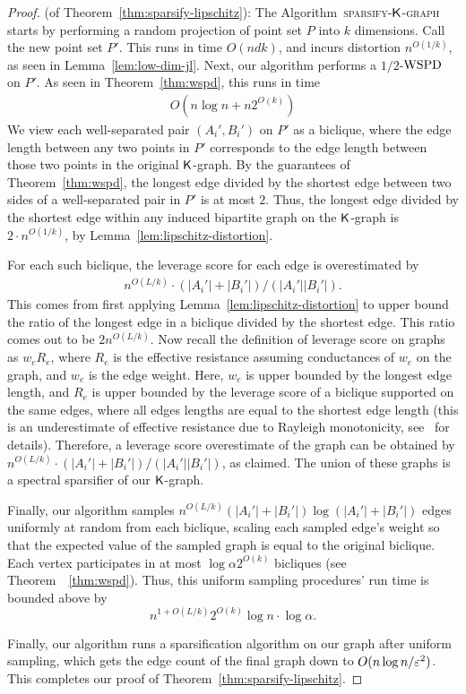 \begin{proof} (of Theorem~\ref{thm:sparsify-lipschitz}):
The Algorithm~\textsc{sparsify-$\mathsf{K}$-graph} starts by performing a random projection of point set $P$ into $k$ dimensions. Call the new point set $P'$. This runs in time $O(ndk)$, and incurs distortion $n^{O(1/k)}$, as seen in Lemma~\ref{lem:low-dim-jl}. 
Next, our algorithm performs a $1/2$-$\mathrm{WSPD}$ on $P'$. As seen in Theorem~\ref{thm:wspd}, this runs in time 
    \begin{align*}
    O(n \log n + n2^{O(k)} )
    \end{align*}  
    We view each well-separated pair $(A_i', B_i')$ on $P'$ as a biclique, where the edge length between any two points in $P'$ corresponds to the edge length between those two points in the original $\mathsf{K}$-graph.
    By the guarantees of Theorem~\ref{thm:wspd},
    the longest edge divided by the shortest edge between two sides of a well-separated pair in $P'$ is at most $2$. Thus, the longest edge divided by the shortest edge within any induced bipartite graph on the $\mathsf{K}$-graph is $2 \cdot n^{O(1/k)}$, by Lemma~\ref{lem:lipschitz-distortion}.
    
    
    
    For each such biclique, the leverage score for each edge is overestimated by 
  \begin{align*}
  n^{O(L/k)} \cdot (|A_i'|+|B_i'|) / (|A_i'||B_i'|).
  \end{align*} 
  This comes from first applying Lemma~\ref{lem:lipschitz-distortion} to upper bound the ratio of the longest edge in a biclique divided by the shortest edge.  This ratio comes out to be $2 n^{O(L/k)}$.  Now recall the definition of leverage score on graphs as $w_e R_e$, where $R_e$ is the effective resistance assuming conductances of $w_e$ on the graph, and $w_e$ is the edge weight. Here, $w_e$ is upper bounded by the longest edge length, and $R_e$ is upper bounded by the leverage score of a biclique supported on the same edges, where all edges lengths are equal to the shortest edge length (this is an underestimate of effective resistance due to Rayleigh monotonicity, see~\cite{c97} for details). Therefore, a leverage score overestimate of the graph can be obtained by $n^{O(L/k)} \cdot (|A_i'|+|B_i'|) / (|A_i'||B_i'|)$, as claimed. The union of these graphs is a spectral sparsifier of our $\mathsf{K}$-graph.
  
  Finally, our algorithm samples
  $n^{O(L/k)}(|A_i'|+|B_i'|)\log(|A_i'|+|B_i'|)$ edges uniformly at random from each biclique, scaling each sampled edge's weight so that the expected value of the sampled graph is equal to the original biclique. Each vertex participates in at most $\log \alpha 2^{O(k)}$ bicliques (see Theorem~~\ref{thm:wspd}). Thus, this uniform sampling procedures' run time is bounded above by 
  \[ 
  n^{1+O(L/k)}2^{O(k)} \log n \cdot \log \alpha.
  \]
  
  Finally, our algorithm runs a sparsification algorithm on our graph after uniform sampling, which gets the edge count of the final graph down to $O(n \log n / \varepsilon^2)$.
This completes our proof of Theorem~\ref{thm:sparsify-lipschitz}.
\end{proof}
  

